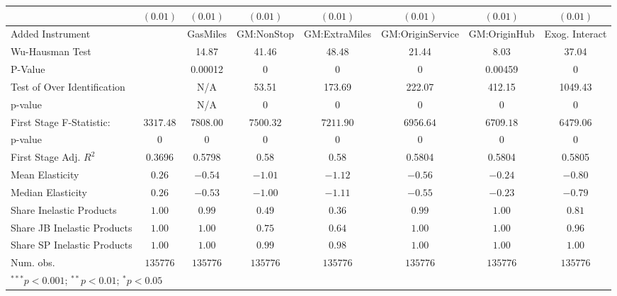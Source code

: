\begin{tabular}{l c c c c c c c}
                             & $(0.01)$      & $(0.01)$      & $(0.01)$      & $(0.01)$      & $(0.01)$         & $(0.01)$      & $(0.01)$       \\
\midrule
Added Instrument             &               & GasMiles      & GM:NonStop    & GM:ExtraMiles & GM:OriginService & GM:OriginHub  & Exog. Interact \\
Wu-Hausman Test              &               & 14.87         & 41.46         & 48.48         & 21.44            & 8.03          & 37.04          \\
P-Value                      &               & 0.00012       & 0             & 0             & 0                & 0.00459       & 0              \\
Test of Over Identification  &               & N/A           & 53.51         & 173.69        & 222.07           & 412.15        & 1049.43        \\
p-value                      &               & N/A           & 0             & 0             & 0                & 0             & 0              \\
First Stage F-Statistic:     & $3317.48$     & $7808.00$     & $7500.32$     & $7211.90$     & $6956.64$        & $6709.18$     & $6479.06$      \\
p-value                      & $0$           & $0$           & $0$           & $0$           & $0$              & $0$           & $0$            \\
First Stage Adj. $R^2$       & 0.3696        & 0.5798        & 0.58          & 0.58          & 0.5804           & 0.5804        & 0.5805         \\
Mean Elasticity              & $0.26$        & $-0.54$       & $-1.01$       & $-1.12$       & $-0.56$          & $-0.24$       & $-0.80$        \\
Median Elasticity            & $0.26$        & $-0.53$       & $-1.00$       & $-1.11$       & $-0.55$          & $-0.23$       & $-0.79$        \\
Share Inelastic Products     & $1.00$        & $0.99$        & $0.49$        & $0.36$        & $0.99$           & $1.00$        & $0.81$         \\
Share JB Inelastic Products  & $1.00$        & $1.00$        & $0.75$        & $0.64$        & $1.00$           & $1.00$        & $0.96$         \\
Share SP Inelastic Products  & $1.00$        & $1.00$        & $0.99$        & $0.98$        & $1.00$           & $1.00$        & $1.00$         \\
Num. obs.                    & $135776$      & $135776$      & $135776$      & $135776$      & $135776$         & $135776$      & $135776$       \\
\bottomrule
\multicolumn{8}{l}{\scriptsize{$^{***}p<0.001$; $^{**}p<0.01$; $^{*}p<0.05$}}
\end{tabular}
